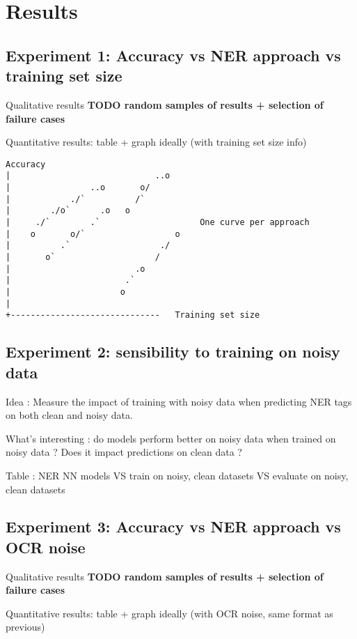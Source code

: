 \section{Results}

\subsection{Experiment 1: Accuracy vs NER approach vs training set size}

Qualitative results
\textbf{TODO random samples of results + selection of failure cases}


Quantitative results: table + graph ideally (with training set size info)

\begin{verbatim}
Accuracy
|                             ..o   
|                ..o       o/       
|            ./`          /`          
|        ./o`      .o   o            
|     ./`        .`                    One curve per approach
|    o       o/`                  o  
|          .`                  ./    
|       o`                    /      
|                         .o        
|                       .`           
|                      o            
|                                   
+------------------------------   Training set size
\end{verbatim}
                                        

\subsection{Experiment 2: sensibility to training on noisy data}
Idea : Measure the impact of training with noisy data when predicting NER tags on both clean and noisy data.

What's interesting : do models perform better on noisy data when trained on noisy data ? Does it impact predictions on clean data ?

Table : NER NN models VS train on {noisy, clean} datasets VS evaluate on {noisy, clean} datasets


\subsection{Experiment 3: Accuracy vs NER approach vs OCR noise}

Qualitative results
\textbf{TODO random samples of results + selection of failure cases}

Quantitative results: table + graph ideally (with OCR noise, same format as previous)


